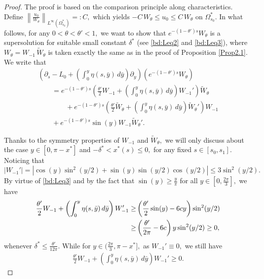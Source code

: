 \documentclass[12pt]{amsart}
\numberwithin{equation}{section}
\numberwithin{equation}{section}
\begin{document}
   
   \begin{proof}
   The proof is based on the comparison principle along characteristics.  Define $ \left\|\frac{u_0}{W_\theta}\right\|_{L^\infty{(\Omega^*_{s_0})}} =:C,$ which yields $-C \,W_\theta\leq u_0\leq C\, W_\theta$ on $\Omega^*_{s_0}.$  In what follows,   for any $0<\theta<\theta'<1,$ we  want to show  that $e^{-(1-\theta')s}W_\theta$  is a supersolution for suitable  small  constant $\delta^*$  {(see \eqref{bd:Leq2} and \eqref{bd:Leq3})},
where  $W_\theta=W_{-1}\, \widetilde{W}_{\theta}$  is taken  exactly the same as in  the proof of Proposition \ref{Prop2.1}.  We write that 
    \begin{multline}\label{Le5-000}
  \left(\partial_s  - L_0 + \left(\int_{0}^y \eta(s,\bar y) \,d\bar y\right) \partial_y \right) \left(e^{-(1-\theta')s}W_\theta \right)  \\
   \qquad=e^{-(1-\theta')s} \left( \frac{\theta'}{2} W_{-1} + \left(\int_{0}^y \eta(s,\bar y) \,d\bar y\right){W}_{-1}' \right) \widetilde{W}_\theta \\
   \qquad  \qquad+e^{-(1-\theta')s} \left( \frac{\theta'}{2} \widetilde{W}_\theta  + \left(\int_{0}^y \eta(s,\bar y) \,d\bar y\right)  \widetilde{W}_{\theta}' \right)W_{-1}  \\
  \qquad  + e^{-(1-\theta')s}  \sin(y)W_{-1} \widetilde{W}_{\theta}'.
  \end{multline}
  
Thanks to the symmetry properties of $W_{-1}$ and $\widetilde{W}_{\theta},$ we will only discuss about the case $y\in[0, \pi-x^*]$ and $-\delta^* <x^*(s)\leq0,$    for any fixed $s\in[s_0,  s_1].$ 
 Noticing  that
 \begin{equation*}
| W_{-1}'|=|\cos(y)\sin^2(y/2)+\sin(y)\sin(y/2)\cos(y/2)|\leq 3\sin^2(y/2).
 \end{equation*}
By virtue of  \eqref{bd:Leq3} and by the fact that $\sin (y)\geq \frac{y}{\pi}$ for  all  $y\in[0, \frac{2\pi}{3}], $    we have
\begin{align}
\frac{\theta'}{2} W_{-1} + \left(\int_{0}^y \eta(s,\bar y) \,d\bar y\right){W}_{-1}' \geq& \left(\frac{\theta'}{2}\sin (y)-6cy\right)\sin^2(y/2)\notag\\
\geq& \left(\frac{\theta'}{2\pi} -6c\right)y\sin^2(y/2)\geq 0,
  \end{align}
 whenever $\delta^*\leq \frac{\theta'}{12\pi}.$ While for $y\in(\frac{2\pi}{3}, \pi-x^*],$ as $W_{-1}'\equiv0,$ we still have 
 \begin{align*}
 \frac{\theta'}{2} W_{-1} + \left(\int_{0}^y \eta(s,\bar y) \,d\bar y\right){W}_{-1}' \geq0.
\end{align*}


\end{proof}
\end{document}
